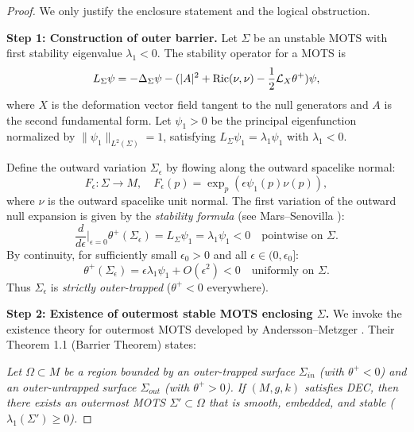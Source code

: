 \begin{proof}
We only justify the enclosure statement and the logical obstruction.

\textbf{Step 1: Construction of outer barrier.}
Let $\Sigma$ be an unstable MOTS with first stability eigenvalue $\lambda_1 < 0$. The stability operator for a MOTS is
\begin{equation}
    L_\Sigma \psi = -\Delta_\Sigma \psi - (|A|^2 + \mathrm{Ric}(\nu,\nu) - \frac{1}{2}\mathcal{L}_X \theta^+) \psi,
\end{equation}
where $X$ is the deformation vector field tangent to the null generators and $A$ is the second fundamental form. Let $\psi_1 > 0$ be the principal eigenfunction normalized by $\|\psi_1\|_{L^2(\Sigma)} = 1$, satisfying $L_\Sigma \psi_1 = \lambda_1 \psi_1$ with $\lambda_1 < 0$.

Define the outward variation $\Sigma_\epsilon$ by flowing along the outward spacelike normal:
\begin{equation}
    F_\epsilon: \Sigma \to M, \quad F_\epsilon(p) = \exp_p(\epsilon \psi_1(p) \nu(p)),
\end{equation}
where $\nu$ is the outward spacelike unit normal. The first variation of the outward null expansion is given by the \emph{stability formula} (see Mars--Senovilla \cite{mars2009}):
\begin{equation}
    \frac{d}{d\epsilon}\bigg|_{\epsilon=0} \theta^+(\Sigma_\epsilon) = L_\Sigma \psi_1 = \lambda_1 \psi_1 < 0 \quad \text{pointwise on } \Sigma.
\end{equation}
By continuity, for sufficiently small $\epsilon_0 > 0$ and all $\epsilon \in (0, \epsilon_0]$:
\begin{equation}
    \theta^+(\Sigma_\epsilon) = \epsilon \lambda_1 \psi_1 + O(\epsilon^2) < 0 \quad \text{uniformly on } \Sigma.
\end{equation}
Thus $\Sigma_\epsilon$ is \emph{strictly outer-trapped} ($\theta^+ < 0$ everywhere).

\textbf{Step 2: Existence of outermost stable MOTS enclosing $\Sigma$.}
We invoke the existence theory for outermost MOTS developed by Andersson--Metzger \cite{anderssonmetzger2009}. Their Theorem 1.1 (Barrier Theorem) states:

\textit{Let $\Omega \subset M$ be a region bounded by an outer-trapped surface $\Sigma_{in}$ (with $\theta^+ < 0$) and an outer-untrapped surface $\Sigma_{out}$ (with $\theta^+ > 0$). If $(M,g,k)$ satisfies DEC, then there exists an outermost MOTS $\Sigma' \subset \Omega$ that is smooth, embedded, and stable ($\lambda_1(\Sigma') \ge 0$).}


\end{proof}
